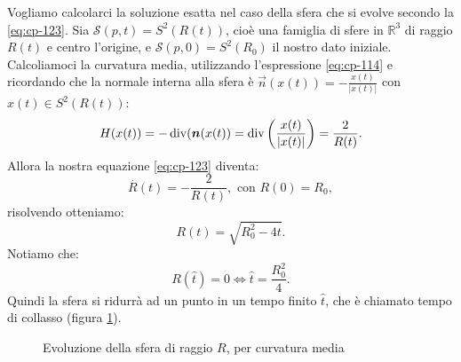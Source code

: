 \begin{esempio}
Vogliamo calcolarci la soluzione esatta nel caso della sfera che si evolve secondo la \eqref{eq:cp-123}. Sia $\mathcal{S}(p,t) = S^2(R(t))$, cioè una famiglia di sfere in $\mathbb{R}^3$ di raggio $R(t)$ e centro l'origine, e $\mathcal{S}(p,0) = S^2(R_0)$ il nostro dato iniziale. Calcoliamoci la curvatura media, utilizzando l'espressione \eqref{eq:cp-114} e ricordando che la normale interna alla sfera è $\vec{n}(x(t))=-\frac{x(t)}{|x(t)|}$ con $x(t)\in S^2(R(t))$:
\[
H(x(t)) =-\operatorname{div}(\bm{n}(x(t))=\operatorname{div}\left(\frac{x(t)}{|x(t)|}\right)=\frac{2}{R(t)}.   
\]
Allora la nostra equazione \eqref{eq:cp-123} diventa:
\[
\overset{.}{R}(t)=-\frac{2}{R(t)}, \text{ con } R(0) = R_0,
\]
risolvendo otteniamo:
\[
R(t)=\sqrt{R_0^2-4t}.
\]
Notiamo che:
\[
R(\hat{t})=0 \Longleftrightarrow \hat{t}=\frac{R_0^2}{4}.
\]
Quindi la sfera si ridurrà ad un punto in un tempo finito $\hat{t}$, che è chiamato tempo di collasso (figura \ref{fig:cp-121}).

\begin{figure}[!htbp]
  \begin{center}
  \end{center}
  \caption{Evoluzione della sfera di raggio $R$, per curvatura media}
  \label{fig:cp-121}
\end{figure}
\end{esempio}

